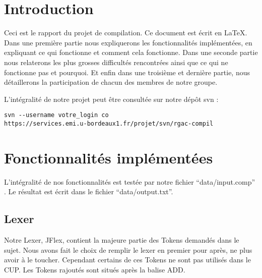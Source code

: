 \documentclass[a4paper,oneside]{article}
\begin{document}




\tableofcontents
\newpage


\section*{Introduction}
Ceci est le rapport du projet de compilation. Ce document est écrit en \LaTeX. \\
Dans une première partie nous expliquerons les fonctionnalités implémentées, en expliquant ce qui fonctionne et comment cela fonctionne.\newline
Dans une seconde partie nous relaterons les plus grosses difficultés rencontrées ainsi que ce qui ne fonctionne pas et pourquoi.\newline
Et enfin dans une troisième et dernière partie, nous détaillerons la participation de chacun des membres de notre groupe. \newline

L'intégralité de notre projet peut être consultée sur notre dépôt svn :

\begin{verbatim}
svn --username votre_login co
https://services.emi.u-bordeaux1.fr/projet/svn/rgac-compil
\end{verbatim}
\newpage



\section{Fonctionnalités implémentées}
L'intégralité de nos fonctionnalités est testée par notre fichier ``data/input.comp'' . Le résultat est écrit dans le fichier ``data/output.txt''.

\subsection{Lexer}

Notre Lexer, JFlex, contient la majeure partie des Tokens demandés dans le sujet. Nous avons fait le choix de remplir le lexer en premier pour après, ne plus avoir à le toucher. Cependant certains de ces Tokens ne sont pas utilisés dans le CUP.
Les Tokens rajoutés sont situés après la balise ADD. 
\end{document}
